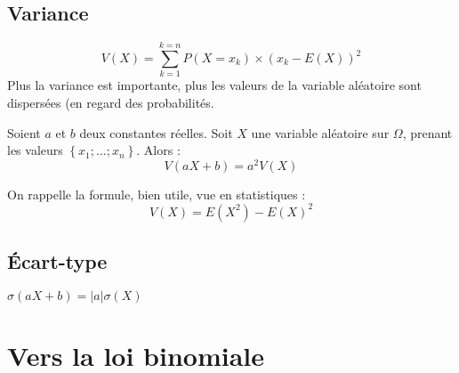 \documentclass[a4paper,11pt]{article} \usepackage{FBarticle} \mapage{831}{Probabilités 1} %
\begin{document}
\begin{multicols}{2}
\newpage
\subsection{Variance}
$$V(X)=\sum_{k=1}^{k=n} P(X=x_k)\times (x_k-E(X))^2$$
\rema Plus la variance est importante, plus les valeurs de la variable aléatoire sont dispersées (en regard des probabilités.\par
{}

\prop Soient $a$ et $b$ deux constantes réelles. Soit $X$ une variable aléatoire sur $\Omega$, prenant les valeurs  $\left\{x_1;...;x_n\right\}$. Alors :
$$V(aX+b)=a^2V(X)$$
\par
\prop On rappelle la formule, bien utile, vue en statistiques :
$$V(X)=E(X^2)-E(X)^2$$
\par



\subsection{Écart-type}
\par
{}\par
\prop $\sigma(aX+b)=|a|\sigma(X)$

\section{Vers la loi binomiale}

\end{multicols}
\end{document}
